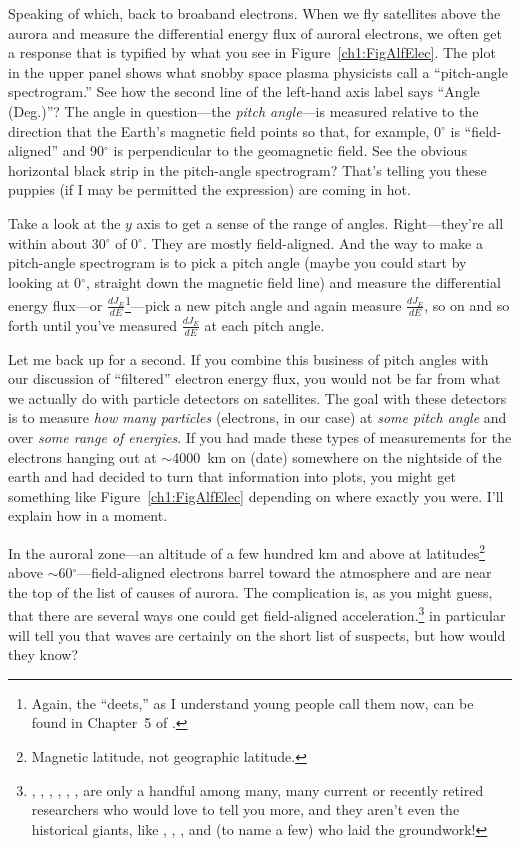 Speaking of which, back to broaband electrons. When we fly satellites
above the aurora and measure the differential energy flux of auroral
electrons, we often get a response that is typified by what you see in
Figure~\ref{ch1:FigAlfElec}. The plot in the upper panel shows what
snobby space plasma physicists call a ``pitch-angle spectrogram.''
See how the second line of the left-hand axis label says ``Angle
(Deg.)''?  The angle in question---the \emph{pitch angle}---is
measured relative to the direction that the Earth's magnetic field
points so that, for example, 0$^\circ$ is ``field-aligned'' and
90$^\circ$ is perpendicular to the geomagnetic field. See the obvious
horizontal black strip in the pitch-angle spectrogram? That's telling
you these puppies (if I may be permitted the expression) are coming in
hot.

Take a look at the $y$ axis to get a sense of the range of
angles. Right---they're all within about 30$^\circ$ of 0$^\circ$. They
are mostly field-aligned. And the way to make a pitch-angle
spectrogram is to pick a pitch angle (maybe you could start by looking
at 0$^\circ$, straight down the magnetic field line) and measure the
differential energy flux---or $\frac{d J_E}{dE}$\footnote{Again, the
  ``deets,'' as I understand young people call them now, can be found
  in Chapter~5 of \citet{Paschmann1998}.}---pick a new pitch angle and
again measure $\frac{d J_E}{dE}$, so on and so forth until you've
measured $\frac{d J_E}{dE}$ at each pitch angle.

Let me back up for a second. If you combine this business of pitch
angles with our discussion of ``filtered'' electron energy flux, you
would not be far from what we actually do with particle detectors on
satellites. The goal with these detectors is to measure \emph{how many
  particles} (electrons, in our case) at \emph{some pitch angle} and
over \emph{some range of energies}. If you had made these types of
measurements for the electrons hanging out at $\sim$4000~km on (date)
somewhere on the nightside of the earth and had decided to turn that
information into plots, you might get something like
Figure~\ref{ch1:FigAlfElec} depending on where exactly you were. I'll
explain how in a moment.

In the auroral zone---an altitude of a few hundred km and above at
latitudes\footnote{Magnetic latitude, not geographic latitude.} above
$\sim$60$^\circ$---field-aligned electrons barrel toward the
atmosphere and are near the top of the list of causes of aurora. The
complication is, as you might guess, that there are several ways one
could get field-aligned acceleration.\footnote{\citet{Wygant2002},
  \citet{Bostrom2003a}, \citet{Morooka2004}, \citet{Newell2009},
  \citet{Hull2010}, \citet{Mottez2016}, are only a handful among many,
  many current or recently retired researchers who would love to tell
  you more, and they aren't even the historical giants, like
  \citet{Knight1973}, \citet{Evans1974}, \citet{Hasegawa1976}, and
  \citet{Lyons1980a} (to name a few) who laid the groundwork!}
\citet{Chaston2002,Chaston2003a,Chaston2007,Chaston2008} in particular
will tell you that \Alf waves are certainly on the short list of
suspects, but how would they know?

